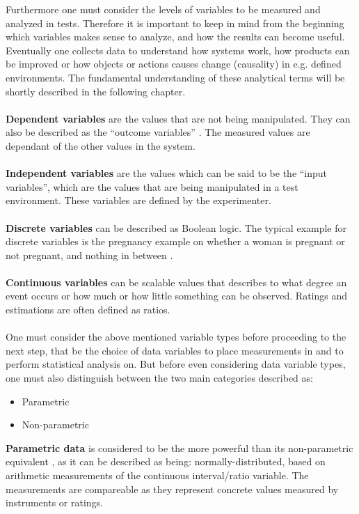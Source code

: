 Furthermore one must consider the levels of variables to be measured and analyzed in tests. Therefore it is important to keep in mind from the beginning which variables makes sense to analyze, and how the results can become useful. Eventually one collects data to understand how systems work, how products can be improved or how objects or actions causes change (causality) in e.g. defined environments. The fundamental understanding of these analytical terms will be shortly described in the following chapter.\\\\
\textbf{Dependent variables} are the values that are not being manipulated. They can also be described as the “outcome variables” \citep[page 21]{Design}. The measured values are dependant of the other values in the system.\\\\
\textbf{Independent variables} are the values which can be said to be the “input variables”, which are the values that are being manipulated in a test environment. These variables are defined by the experimenter.\\\\
\textbf{Discrete variables} can be described as Boolean logic. The typical example for discrete variables is the pregnancy example on whether a woman is pregnant or not pregnant, and nothing in between \citep[page 9]{Design}.\\\\
\textbf{Continuous variables} can be scalable values that describes to what degree an event occurs or how much or how little something can be observed. Ratings and estimations are often defined as ratios. 
\\\\One must consider the above mentioned variable types before proceeding to the next step, that be the choice of data variables to place measurements in and to perform statistical analysis on. But before even considering data variable types, one must also distinguish between the two main categories described as: 
\begin{itemize}
\item Parametric
\item Non-parametric
\end{itemize}
\textbf{Parametric data} is considered to be the more powerful than its non-parametric equivalent \citep[page 21]{Design}, as it can be described as being: normally-distributed, based on arithmetic measurements of the continuous interval/ratio variable. The measurements are compareable as they represent concrete values measured by instruments or ratings.

